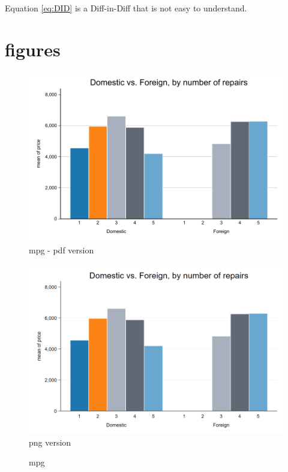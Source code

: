 \documentclass[11pt,letterpaper]{article}
\begin{document}
Equation \ref{eq:DID} is a Diff-in-Diff that is not easy to understand.

\newpage


\section{figures}

\begin{figure}[ht]
\centering 
\includegraphics[width=1\textwidth]{outputs/figures/pdf/graph_repair_prices.pdf}
\caption{mpg - pdf version}
\label{fig:mpg_pdf}
\end{figure}


\begin{figure}[ht]
\centering
\caption{mpg}
\label{fig:mpg_png}
\includegraphics[width=1\textwidth]{outputs/figures/png/graph_repair_prices.png}
{\footnotesize png version} 
\end{figure}
\end{document}

